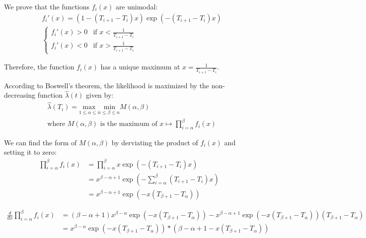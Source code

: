 \documentclass{journalstyle}
\begin{document}
We prove that the functions $f_i(x)$ are unimodal:
\begin{equation*}
    \begin{split}
        &f_i'(x) = (1 - (T_{i+1} - T_i) x) \exp(-(T_{i+1} - T_i) x) \\
        &\begin{cases}
            f_i'(x) > 0 & \text{if } x < \frac{1}{T_{i+1} - T_i} \\
            f_i'(x) < 0 & \text{if } x > \frac{1}{T_{i+1} - T_i}
        \end{cases}
    \end{split}
\end{equation*}

Therefore, the function $f_i(x)$ has a unique maximum at $x = \frac{1}{T_{i+1} - T_i}$.

According to Boswell's theorem, the likelihood is maximized by the non-decreasing function $\hat{\lambda}(t)$ given by:
\begin{equation*}
    \begin{split}
        &\hat{\lambda}(T_i) = \underset{1 \leq \alpha \leq i}{\text{max}} \underset{i \leq \beta \leq n}{\text{min}} M(\alpha, \beta) \\
        &\text{where } M(\alpha, \beta) \text{ is the maximum of } x \mapsto \prod_{i=\alpha}^{\beta} f_i(x)
    \end{split}
\end{equation*}

We can find the form of $M(\alpha, \beta)$ by derviating the product of $f_i(x)$ and setting it to zero:
\begin{equation*}
    \begin{split}
        \prod_{i=\alpha}^{\beta} f_i(x) &= \prod_{i=\alpha}^{\beta} x \exp(-(T_{i+1} - T_i) x) \\
        &= x^{\beta - \alpha + 1} \exp\left(-\sum_{i=\alpha}^{\beta} (T_{i+1} - T_i) x\right) \\
        &= x^{\beta - \alpha + 1} \exp(-x(T_{\beta + 1} - T_{\alpha}))
    \end{split}
\end{equation*}

\begin{equation*}
    \begin{split}
        \frac{d}{dx} \prod_{i=\alpha}^{\beta} f_i(x) &= (\beta - \alpha + 1) x^{\beta - \alpha} \exp(-x(T_{\beta + 1} - T_{\alpha})) - x^{\beta - \alpha + 1} \exp(-x(T_{\beta + 1} - T_{\alpha})) (T_{\beta + 1} - T_{\alpha}) \\
        &= x^{\beta - \alpha} \exp(-x(T_{\beta + 1} - T_{\alpha})) * (\beta - \alpha + 1 - x(T_{\beta + 1} - T_{\alpha}))
    \end{split}
\end{equation*}
\end{document}
